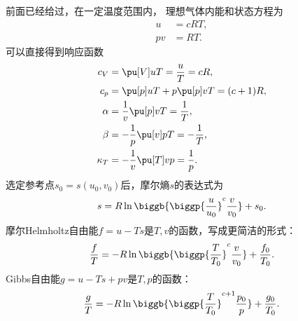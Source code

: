 前面已经给过，在一定温度范围内，
理想气体内能和状态方程为
\begin{subequations}
	\begin{align}
		u&=cRT,\\
		pv&=RT.
	\end{align}
\end{subequations}
可以直接得到响应函数
\begin{subequations}
	\begin{align}
		c_V&=\pu[V]uT=\frac uT=cR,\\
		c_p&=\pu[p]uT+p\pu[p]vT=(c+1)R,\\
		\alpha&=\frac1v\pu[p]vT=\frac1T,\\
		\beta&=-\frac1p\pu[v]pT=-\frac1T,\\
		\kappa_T&=-\frac1v\pu[T]vp=\frac1p.
	\end{align}
\end{subequations}
选定参考点$s_0=s(u_0,v_0)$后，摩尔熵$s$的表达式为
\begin{equation}
	s=R\ln\biggb{\biggp{\frac u{u_0}}^c\frac v{v_0}}+s_0.
\end{equation}
摩尔Helmholtz自由能$f=u-Ts$是$T,v$的函数，写成更简洁的形式：
\begin{equation}
	\frac fT=-R\ln\biggb{\biggp{\frac T{T_0}}^c\frac v{v_0}}+\frac{f_0}{T_0}.
\end{equation}
Gibbs自由能$g=u-Ts+pv$是$T,p$的函数：
\begin{equation}
	\frac gT=-R\ln\biggb{\biggp{\frac T{T_0}}^{c+1}\frac{p_0}p}+\frac{g_0}{T_0}.
\end{equation}


